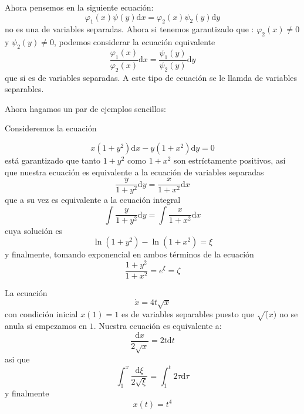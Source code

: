 Ahora pensemos en la siguiente ecuación:
$$
\varphi_1(x)\psi(y)\mathrm{d}x=\varphi_2(x)\psi_2(y)\mathrm{d}y
$$
no es una de variables separadas. Ahora si tenemos garantizado que : $\varphi_2(x)\neq 0$ y $\psi_2(y)\neq 0$, podemos  considerar la ecuación equivalente
$$
\frac{\varphi_1(x)}{\varphi_2(x)}\mathrm{d}x=\frac{\psi_1(y)}{\psi_2(y)}\mathrm{d}y
$$
que si es de variables separadas. A este tipo de ecuación se le llamda de variables separables.

Ahora hagamos un par de ejemplos sencillos:

\begin{ejemplo}
Consideremos la ecuación

$$
x(1+y^2)\mathrm{d}x-y(1+x^2)\mathrm{d}y=0
$$
está garantizado que  tanto $1+y^2$ como $1+x^2$ son estríctamente positivos, así que nuestra ecuación es equivalente a la ecuación de variables separadas
$$
\frac{y}{1+y^2}\mathrm{d}y=\frac{x}{1+x^2}\mathrm{d}x
$$
que a su vez es equivalente a la ecuación integral
$$
\int \frac{y}{1+y^2}\mathrm{d}y=\int \frac{x}{1+x^2}\mathrm{d}x
$$
cuya solución es 
$$
\ln(1+y^2)-\ln(1+x^2)=\xi
$$
y finalmente, tomando exponencial en ambos términos de la ecuación
$$
\frac{1+y^2}{1+x^2}=e^{\xi}=\zeta
$$
\end{ejemplo}

\begin{ejemplo}
La ecuación
$$
\dot{x}=4t\sqrt{x}
$$
con condición inicial $x(1)=1$ es de variables separables puesto que $\sqrt(x)$ no se anula si empezamos en $1$. Nuestra ecuación es equivalente a:
$$
\frac{\mathrm{d}x}{2\sqrt{x}}=2t\mathrm{d}t
$$
asi que
$$
\int_{1}^{x}\frac{\mathrm{d}\xi}{2\sqrt{\xi}}=\int_{1}^{t}2\tau\mathrm{d}\tau
$$
y finalmente
$$
x(t)=t^4
$$
\end{ejemplo}